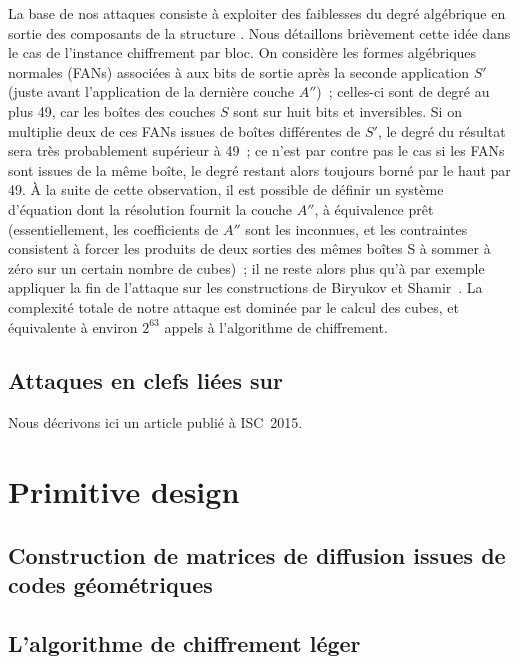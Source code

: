 La base de nos attaques consiste à exploiter des faiblesses du degré algébrique en sortie des composants de la structure \asasa. Nous détaillons brièvement cette idée dans le cas de l'instance
chiffrement par bloc. On considère les formes algébriques normales (FANs) associées à aux bits de sortie après la seconde application $S'$ (juste avant l'application de la dernière couche $A''$)~;
celles-ci sont de degré au plus 49, car les boîtes des couches $S$ sont sur huit bits et inversibles. Si on multiplie deux de ces FANs issues de boîtes différentes de $S'$, le degré du résultat
sera très probablement supérieur à 49~; ce n'est par contre pas le cas si les FANs sont issues de la même boîte, le degré restant alors toujours borné par le haut par 49.
À la suite de cette observation, il est possible de définir un système d'équation dont la résolution fournit la couche $A''$, à équivalence prêt (essentiellement,
les coefficients de $A''$ sont les inconnues, et les contraintes consistent à forcer les produits de deux sorties des mêmes boîtes S à sommer à zéro sur un certain nombre de cubes)~; il ne reste alors plus qu'à par exemple
appliquer la fin de l'attaque sur les constructions \sasas de Biryukov et Shamir~\cite{DBLP:conf/eurocrypt/BiryukovS01}. La complexité totale de notre attaque est dominée par le calcul
des cubes, et équivalente à environ $2^{63}$ appels à l'algorithme de chiffrement.

\subsection{Attaques en clefs liées sur \proestotr \cite{DBLP:conf/isw/Karpman15}}

Nous décrivons ici un article publié à ISC~2015.


\section[Conception de primitives]{Primitive design}

\subsection{Construction de matrices de diffusion issues de codes géométriques~\cite{DBLP:conf/sacrypt/AugotFK14}}

\subsection{L'algorithme de chiffrement léger \fly \cite{fly}}

